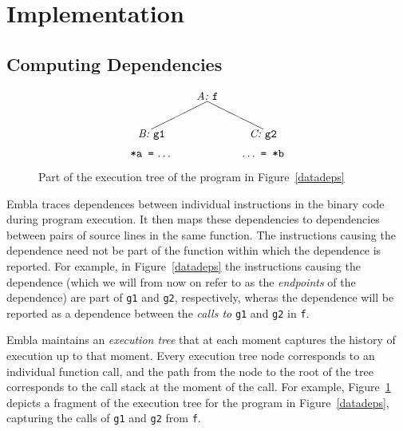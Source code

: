 \section{Implementation}

\subsection{Computing Dependencies}   \label{snca}

\begin{figure} \small
\hrulefill
\[
\begin{picture}(160,60)(70,15)
\put(120,65){\makebox(60,10)[c]{\it A:\ \tt f}}
\put(150,65){\line(-2,-1){50}}
\put(150,65){\line( 2,-1){50}}
\put(170,30){\makebox(60,10)[c]{\it C:\ \tt g2}}
\put(70,30){\makebox(60,10)[c]{\it B:\ \tt g1}}
\put(70,15){\makebox(60,10)[cb]{{\tt *a\ =}\ \ldots}}
\put(170,15){\makebox(60,10)[cb]{\ldots\ {\tt =\ *b}}}
\end{picture}
\]
\hrulefill
\caption{Part of the execution tree of the program in Figure~\ref{datadeps}
} 
\label{ffextree}
\end{figure}

Embla traces dependences between individual instructions in the binary
code during program execution. It then maps these dependencies to 
dependencies between pairs of source lines in the same function. The
instructions causing the dependence need not be part of the function 
within which the dependence is reported. For example, in 
Figure~\ref{datadeps} the instructions causing the dependence (which we
will from now on refer to as the {\em endpoints} of the dependence) 
are part of {\tt g1} and {\tt g2}, respectively, wheras the dependence 
will be reported as a dependence between the {\em calls to} {\tt g1} and 
{\tt g2} in {\tt f}.

Embla maintains an {\em execution tree} that at each moment captures 
the history of execution up to that moment. Every execution tree node 
corresponds to an
individual function call, and the path from the node to the root of the
tree corresponds to the call stack at the moment of the call. For
example, Figure~\ref{ffextree} depicts a fragment of the execution tree
for the program in Figure~\ref{datadeps}, capturing the calls of {\tt g1} 
and {\tt g2} from {\tt f}.

